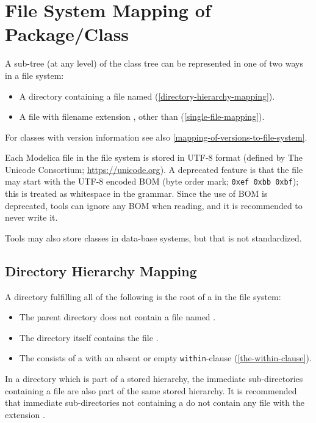 \section{File System Mapping of Package/Class}\label{mapping-package-class-structures-to-a-hierarchical-file-system}\label{file-system-mapping-of-package-class}

A sub-tree (at any level) of the class tree can be represented in one of two ways in a file system:
\begin{itemize}
\item
  A directory containing a file named  (\cref{directory-hierarchy-mapping}).
\item
  A file with filename extension , other than  (\cref{single-file-mapping}).
\end{itemize}

For classes with version information see also \cref{mapping-of-versions-to-file-system}.

Each Modelica file in the file system is stored in UTF-8 format (defined by The Unicode Consortium; \url{https://unicode.org}).
A deprecated feature is that the file may start with the UTF-8 encoded BOM (byte order mark; \lstinline!0xef 0xbb 0xbf!); this is treated as whitespace in the grammar.
Since the use of BOM is deprecated, tools can ignore any BOM when reading, and it is recommended to never write it.

\begin{nonnormative}
Tools may also store classes in data-base systems, but that is not standardized.
\end{nonnormative}


\subsection{Directory Hierarchy Mapping}\label{mapping-a-package-class-hierarchy-into-a-directory-hierarchy-structured-entity}\label{directory-hierarchy-mapping}

A directory fulfilling all of the following is the root of a  in the file system:
\begin{itemize}
\item
  The parent directory does not contain a file named .
\item
  The directory itself contains the file .
\item
  The  consists of a  with an absent or empty \lstinline!within!-clause (\cref{the-within-clause}).
\end{itemize}
In a directory which is part of a stored hierarchy, the immediate sub-directories containing a  file are also part of the same stored hierarchy.
It is recommended that immediate sub-directories not containing a  do not contain any file with the extension .

